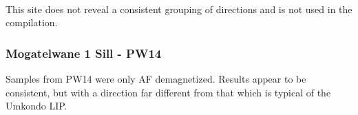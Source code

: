 \documentclass{article}
\begin{document}
    \begin{center}
    \end{center}
    { \hspace*{\fill} \\}
    
    This site does not reveal a consistent grouping of directions and is not
used in the compilation.

    \subsubsection{Mogatelwane 1 Sill -
PW14}\label{mogatelwane-1-sill---pw14}

    Samples from PW14 were only AF demagnetized. Results appear to be
consistent, but with a direction far different from that which is
typical of the Umkondo LIP.
\end{document}
